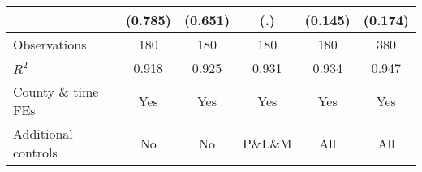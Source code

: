 {\begin{tabular}{l*{5}{c}}
                    &     (0.785)         &     (0.651)         &         (.)         &     (0.145)         &     (0.174)         \\
\hline
Observations        &         180         &         180         &         180         &         180         &         380         \\
\(R^{2}\)           &       0.918         &       0.925         &       0.931         &       0.934         &       0.947         \\
County \& time FEs  &         Yes         &         Yes         &         Yes         &         Yes         &         Yes         \\
Additional controls &          No         &          No         &     P\&L\&M         &         All         &         All         \\
\hline\hline
\end{tabular}
}
